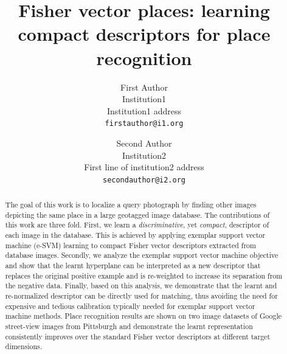 \documentclass[10pt,twocolumn,letterpaper]{article}
\begin{document}
\title{Fisher vector places: learning compact descriptors for place recognition}

\author{First Author\\
Institution1\\
Institution1 address\\
{\tt\small firstauthor@i1.org}
\and
Second Author\\
Institution2\\
First line of institution2 address\\
{\tt\small secondauthor@i2.org}
}

\maketitle

\begin{abstract}
   \noindent
   The goal of this work is to localize a query photograph by finding other images depicting the same place in a large geotagged image database. The contributions of this work are three fold. First, we learn a {\em discriminative}, yet {\em compact}, descriptor of each image in the database. This is achieved by applying exemplar support vector machine (e-SVM) learning to compact Fisher vector descriptors extracted from database images. Secondly, we analyze the exemplar support vector machine objective and show that the learnt hyperplane can be interpreted as a new descriptor that replaces the original positive example and is re-weighted to increase its separation from the negative data. Finally, based on this analysis, we demonstrate that the learnt and re-normalized descriptor can be directly used for matching, thus avoiding the need for expensive and tedious calibration typically needed for exemplar support vector machine methods. Place recognition results are shown on two image datasets of Google street-view images from Pittsburgh  and demonstrate the learnt representation consistently improves over the standard Fisher vector descriptors at different target dimensions. 
\end{abstract}

\end{document}
